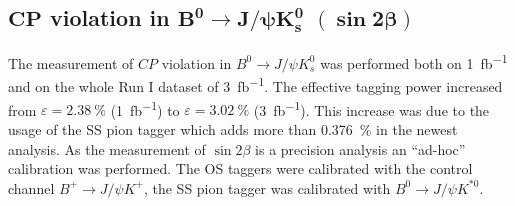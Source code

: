 \documentclass{PoS}
\begin{document}
%

\subsection{$\bm{C\!P}$ violation in $\bm{B^0}\bm{\to} \bm{J\!/\!\psi K_s^0}$ $\pmb{(\sin 2\beta)}$}

The measurement of $C\!P$ violation in $B^0\to J\!/\!\psi K_s^0$ was performed both on \SI{1}{fb^{-1}} and on the whole Run I dataset of \SI{3}{fb^{-1}}. The effective tagging power increased from $\varepsilon=\SI{2.38}{\%}$ (\SI{1}{fb^{-1}}) to $\varepsilon=\SI{3.02}{\%}$ (\SI{3}{fb^{-1}}). This increase was due to the usage of the SS pion tagger which adds more than \SI{0.376}{\%} in the newest analysis. As the measurement of $\sin 2\beta$ is a precision analysis an \enquote{ad-hoc} calibration was performed. The OS taggers were calibrated with the control channel $B^+\to J\!/\!\psi K^+$, the SS pion tagger was calibrated with $B^0\to J\!/\!\psi K^{*0}$. 

%
\end{document}
